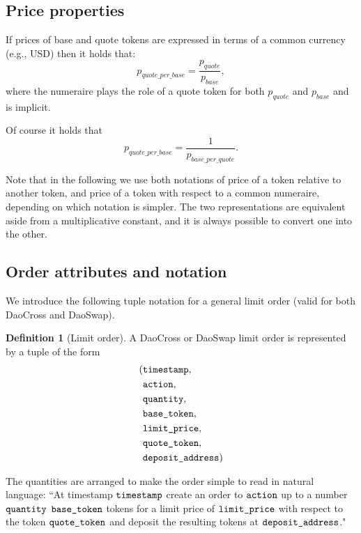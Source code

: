 \documentclass[11pt, reqno]{amsart}
\theoremstyle{definition}
\newtheorem{defn}{Definition}[subsection]
\theoremstyle{remark}
\newcommand{\timestamp}{\textnormal{\texttt{timestamp}}}
\newcommand{\action}{\textnormal{\texttt{action}}}
\newcommand{\quantity}{\textnormal{\texttt{quantity}}}
\newcommand{\basetoken}{\textnormal{\texttt{base\_token}}}
\newcommand{\limitprice}{\textnormal{\texttt{limit\_price}}}
\newcommand{\quotetoken}{\textnormal{\texttt{quote\_token}}}
\newcommand{\depositaddress}{\textnormal{\texttt{deposit\_address}}}
\begin{document}
\subsection{Price properties}
If prices of base and quote tokens are expressed in terms of a common currency
(e.g., USD) then it holds that:
\[
	p_{quote\_per\_base} = \frac{p_{quote}}{p_{base}},
\]
where the numeraire plays the role of a quote token for both $p_{quote}$ and
$p_{base}$ and is implicit.

Of course it holds that
\[
	p_{quote\_per\_base} =
	\frac{1}{p_{base\_per\_quote}}.
\]

Note that in the following we use both notations of price of a token relative to
another token, and price of a token with respect to a common numeraire, depending
on which notation is simpler.
The two representations are equivalent aside from a multiplicative constant, and
it is always possible to convert one into the other.

\subsection{Order attributes and notation}
We introduce the following tuple notation for a general limit order
(valid for both DaoCross and DaoSwap).
\begin{defn}[Limit order]
A DaoCross or DaoSwap limit order is represented by a tuple of the form
\begin{align*}
( & \timestamp,       \\
  & \action,          \\
  & \quantity,        \\
  & \basetoken,       \\
  & \limitprice,      \\
  & \quotetoken,      \\
  & \depositaddress )
\end{align*}
\end{defn}

The quantities are arranged to make the order simple to read in natural
language:
``At timestamp $\timestamp$ create an order to $\action$ up to a number
$\quantity$ $\basetoken$ tokens for a limit price of $\limitprice$ with respect
to the token $\quotetoken$ and deposit the resulting tokens at
$\depositaddress$."
\end{document}
